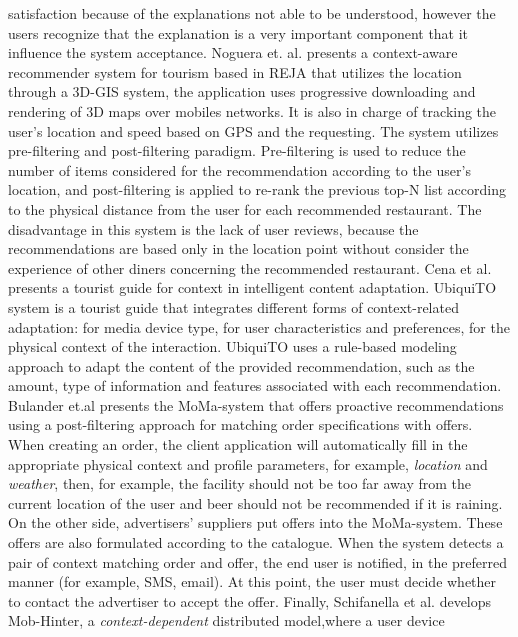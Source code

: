 satisfaction because of the explanations not able to be understood,
however the users recognize that the explanation is a very important
component that it influence the system acceptance. Noguera et. al.
\cite{noguera2012mobile} presents a context-aware recommender system
for tourism based in REJA that utilizes the location through a 3D-GIS
system, the application uses progressive downloading and rendering of
3D maps over mobiles networks. It is also in charge of tracking the
user’s location and speed based on GPS and the requesting. The system
utilizes pre-filtering and post-filtering paradigm. Pre-filtering is
used to reduce the number of items considered for the recommendation
according to the user’s location, and  post-filtering is applied to
re-rank the previous top-N list according to the physical distance
from the user for each recommended restaurant. The disadvantage in this
system is the lack of user reviews, because the recommendations are
based only in the location point without consider the experience of
other diners concerning the recommended restaurant. 
Cena et al.\cite{cena2006integrating} presents a tourist guide for
context in intelligent content adaptation. UbiquiTO system is a
tourist guide that integrates different forms of context-related
adaptation: for media device type, for user characteristics and
preferences, for the physical context of the interaction. UbiquiTO uses
a rule-based modeling approach to adapt the content of the provided
recommendation, such as the amount, type of information and features
associated with each recommendation. 
Bulander et.al\cite{bulander2005comparison} presents the MoMa-system that
offers proactive recommendations using a post-filtering approach for
matching order specifications with offers. When creating an order, the
client application will automatically fill in the appropriate physical
context and profile parameters, for example, \textit{location} and \textit{weather},
then, for example, the facility should not be too far away from the
current location of the user and beer should not be
recommended if it is raining. On the other side, advertisers’
suppliers put offers into the MoMa-system. These offers are also
formulated according to the catalogue. When the system detects a pair
of context matching order and offer, the end user is notified, in the
preferred manner (for example, SMS, email). At this point, the user
must decide whether to contact the advertiser to accept the offer.
Finally, Schifanella et al.\cite{schifanella2008mobhinter} develops
Mob-Hinter, a \textit{context-dependent} distributed model,where a user device

